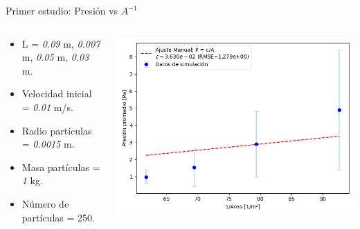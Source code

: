 \documentclass{beamer}
\begin{document}
\begin{frame}{Primer estudio: Presión vs $A^{-1}$}
  \begin{columns}
    \begin{column}{0.40\textwidth}
      \scriptsize {}
      \begin{itemize}
        \item L = \textit{0.09} m, \textit{0.007} m, \textit{0.05} m, \textit{0.03} m. 
        \item Velocidad inicial = \textit{0.01} m/s.
        \item Radio partículas = \textit{0.0015} m.
        \item Masa partículas = \textit{1} kg.
        \item Número de partículas = 250.
      \end{itemize}
    \end{column}
    \begin{column}{0.60\textwidth}
      \includegraphics[width=1\linewidth]{photoMaterial/Presion_vs_area_ajuste.png}
    \end{column}
  \end{columns}
\end{frame}
\end{document}
